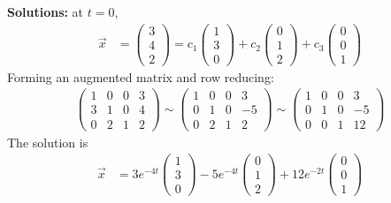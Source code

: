 \begin{parts}
\ifnum {} {\color{DarkBlue} 
\textbf{Solutions:} at $t=0$, 
    \begin{align}
        \vec x &= 
        \begin{pmatrix} 3\\4\\2 \end{pmatrix} = 
        c_1  \begin{pmatrix} 1\\3\\0  \end{pmatrix} + 
        c_2  \begin{pmatrix} 0\\1\\2  \end{pmatrix} + 
        c_3  \begin{pmatrix} 0\\0\\1 \end{pmatrix}
    \end{align}
    Forming an augmented matrix and row reducing: 
    \begin{align}
        \begin{pmatrix} 1&0&0&3 \\ 3&1&0 & 4 \\ 0&2&1&2 \end{pmatrix} 
        \sim \begin{pmatrix} 1&0&0&3 \\ 0&1&0 & -5 \\ 0&2&1&2 \end{pmatrix} 
        \sim \begin{pmatrix} 1&0&0&3 \\ 0&1&0 & -5 \\ 0& 0 &1&12 \end{pmatrix} 
    \end{align}
    The solution is
    \begin{align}
        \vec x &= 
        3 e^{-4t} \begin{pmatrix} 1\\3\\0  \end{pmatrix} 
        -5 e^{-4t} \begin{pmatrix} 0\\1\\2  \end{pmatrix} 
        +12 e^{-2t} \begin{pmatrix} 0\\0\\1 \end{pmatrix}
    \end{align}    
} 
\else 
\fi    
\end{parts}
\fi

